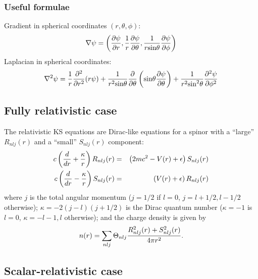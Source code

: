 \documentclass[12pt,a4paper]{article}
\begin{document}
\subsubsection{Useful formulae} 

Gradient in spherical coordinates $(r,\theta,\phi)$:
\begin{equation}
\nabla\psi = \left({\partial\psi\over\partial r},
                   {1\over r}{\partial\psi\over\partial\theta},
                   {1\over r \mbox{sin}\theta}
                              {\partial\psi\over\partial\phi}
             \right)
\end{equation}
Laplacian in spherical coordinates:
\begin{equation}
\nabla^2\psi = {1\over r} {\partial^2\over\partial r^2}(r\psi)
             + {1\over r^2\mbox{sin}\theta} {\partial\over\partial\theta}
               \left(\mbox{sin}\theta{\partial\psi\over\partial\theta}\right)
             + {1\over r^2\mbox{sin}^2\theta}
                {\partial^2\psi\over\partial\phi^2}
\end{equation}

\subsection{Fully relativistic case} 

The relativistic KS equations are
Dirac-like equations for a spinor with a ``large'' $R_{nlj}(r)$ and
a ``small'' $S_{nlj}(r)$ component:
\begin{eqnarray}
c\left({d \over dr} + {\kappa\over r}\right)R_{nlj}(r) & = & 
       \left(2mc^2 - V(r) + \epsilon \right)S_{nlj}(r)\\
c\left({d \over dr} - {\kappa\over r}\right)S_{nlj}(r) & = & 
       \left( V(r) + \epsilon \right)       R_{nlj}(r)
\end{eqnarray}
where $j$ is the total angular momentum ($j=1/2$ if $l=0$, 
$j=l+1/2,l-1/2$ otherwise); $\kappa=-2(j-l)(j+1/2)$ is the Dirac 
quantum number ($\kappa=-1$ is $l=0$, $\kappa=-l-1,l$ otherwise);
and the charge density is given by
\begin{equation}
  n(r) = \sum_{nlj} \Theta_{nlj}{R^2_{nlj}(r)+S^2_{nlj}(r)\over 4\pi r^2}.
\end{equation}


\subsection{Scalar-relativistic case} 
\end{document}
